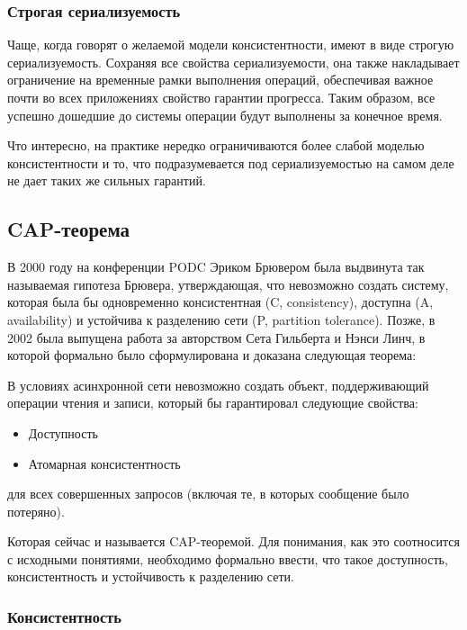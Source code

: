 \subsubsection{Строгая сериализуемость}

Чаще, когда говорят о желаемой модели консистентности, имеют в виде строгую сериализуемость. Сохраняя все свойства сериализуемости, она также накладывает ограничение на временные рамки выполнения операций, обеспечивая важное почти во всех приложениях свойство гарантии прогресса. Таким образом, все успешно дошедшие до системы операции будут выполнены за конечное время.

Что интересно, на практике нередко ограничиваются более слабой моделью консистентности и то, что подразумевается под сериализуемостью на самом деле не дает таких же сильных гарантий.

\subsection{CAP-теорема}

В 2000 году на конференции PODC Эриком Брювером была выдвинута так называемая гипотеза Брювера, утверждающая, что невозможно создать систему, которая была бы одновременно консистентная (C, consistency), доступна (A, availability) и устойчива к разделению сети (P, partition tolerance)\cite{brewer}. Позже, в 2002 была выпущена работа за авторством Сета Гильберта и Нэнси Линч\cite{cap-proof}, в которой формально было сформулирована и доказана следующая теорема:

\begin{theorem}
	В условиях асинхронной сети невозможно создать объект, поддерживающий операции чтения и записи, который бы гарантировал следующие свойства:
	
	\begin{itemize}
		\item Доступность
		\item Атомарная консистентность
	\end{itemize}
	
	для всех совершенных запросов (включая те, в которых сообщение было потеряно).
\end{theorem}

Которая сейчас и называется CAP-теоремой. Для понимания, как это соотносится с исходными понятиями, необходимо формально ввести, что такое доступность, консистентность и устойчивость к разделению сети.

\subsubsection{Консистентность}

